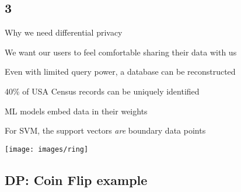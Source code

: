 \documentclass[xor=table]{beamer}
\let\svpar\par
\let\svitemize\itemize
\let\svenditemize\enditemize
\let\svitem\item
\let\svcenter\center
\let\svendcenter\endcenter
\let\svcolumn\column
\let\svendcolumn\endcolumn
\newcommand\stretchoff{%
  \let\par\svpar%
  \let\item\svitem%
  \let\itemize\svitemize%
  \let\enditemize\svenditemize%
  \let\center\svcenter%
  \let\endcenter\svendcenter%
  \let\column\svcolumn%
  \let\endcolumn\svendcolumn%
}
\begin{document}
\subsection*{3}
\stretchoff

\begin{frame}{Why we need differential privacy}

\begin{minipage}[l]{0.6\linewidth}

\begin{itemize}

\item We want our users to feel comfortable sharing their data with us
\medskip


\item[$\bullet$] Even with limited query power, a database can be reconstructed
	\begin{itemize}
	\item 40\% of USA Census records can be uniquely identified
	\end{itemize}
\medskip


\item[$\bullet$] ML models embed data in their weights 
	\begin{itemize}
	\item For SVM, the support vectors \emph{are} boundary data points
	\end{itemize}
\end{itemize}
\end{minipage}%
	\begin{minipage}[r]{0.4\linewidth}
	\begin{center}
	\texttt{[image: images/ring]}
	\end{center}
\end{minipage}

\end{frame}





\subsection*{DP: Coin Flip example}
\stretchoff
{}
\end{document}
